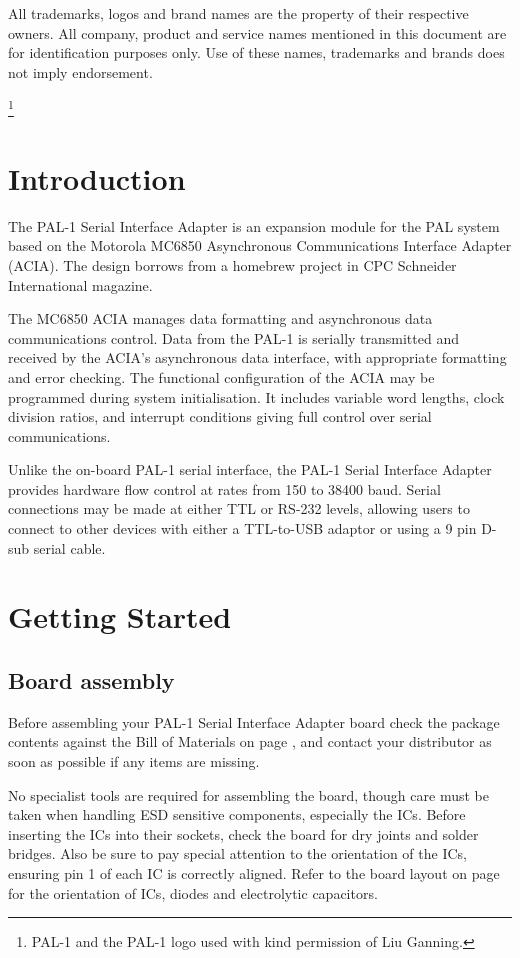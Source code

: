 \documentclass[a4paper,11pt,twoside,openright]{report}
\newcommand\mainmatter{
  \cleardoublepage
  \pagenumbering{arabic}}
\begin{document}
All trademarks, logos and brand names are the property of their respective owners. All company, product and service names mentioned in this document are for identification purposes only. Use of these names, trademarks and brands does not imply endorsement.

\thanks{PAL-1 and the PAL-1 logo used with kind permission of Liu Ganning.}
\clearpage
\tableofcontents
\listoffigures
\cleardoublepage
\chapter*{Introduction}
The PAL-1 Serial Interface Adapter is an expansion module for the PAL system\cite{ganning1} based on the Motorola MC6850 Asynchronous Communications Interface Adapter (ACIA)\cite{motorola1}. The design borrows from a homebrew project in CPC Schneider International magazine\cite[pp. 88--92]{cpc1}.

The MC6850 ACIA manages data formatting and asynchronous data communications control. Data from the PAL-1 is serially transmitted and received by the ACIA's asynchronous data interface, with appropriate formatting and error checking. The functional configuration of the ACIA may be programmed during system initialisation. It includes variable word lengths, clock division ratios, and interrupt conditions giving full control over serial communications\cite[p. 11]{motorola2}.

Unlike the on-board PAL-1 serial interface, the PAL-1 Serial Interface Adapter provides hardware flow control at rates from 150 to 38400 baud. Serial connections may be made at either TTL or RS-232 levels, allowing users to connect to other devices with either a TTL-to-USB adaptor or using a 9 pin D-sub serial cable.

\mainmatter
\chapter{Getting Started}
\section*{Board assembly}
Before assembling your PAL-1 Serial Interface Adapter board check the package contents against the Bill of Materials on page \pageref{sec:bom}, and contact your distributor as soon as possible if any items are missing.

No specialist tools are required for assembling the board, though care must be taken when handling ESD sensitive components, especially the ICs. Before inserting the ICs into their sockets, check the board for dry joints and solder bridges. Also be sure to pay special attention to the orientation of the ICs, ensuring pin 1 of each IC is correctly aligned. Refer to the board layout on page \pageref{fig:layout} for the orientation of ICs, diodes and electrolytic capacitors.
\end{document}
